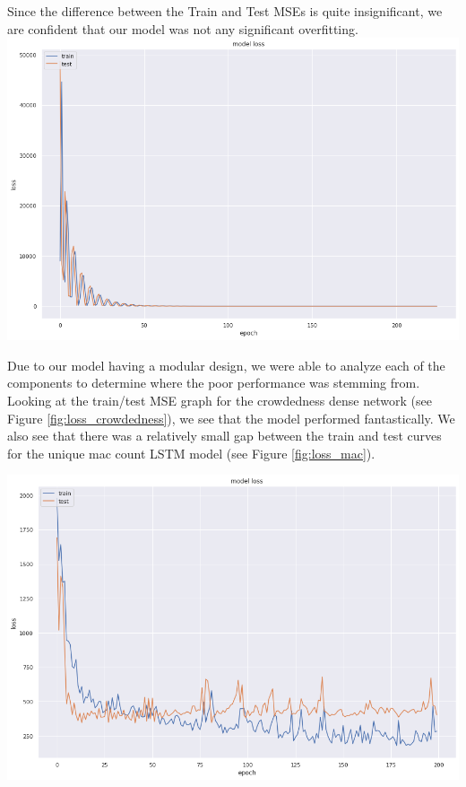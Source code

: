 \documentclass[journal, 12pt]{IEEEtran}
\begin{document}
\noindent Since the difference between the Train and Test MSEs is quite insignificant, we are confident that our model was not any significant overfitting. \\

\begingroup
    \center
    \medskip
    \includegraphics[width=\columnwidth]{report/final_report/images/crowdedness.png}
    \label{fig:loss_crowdedness}
    \medskip
\endgroup

\noindent Due to our model having a modular design, we were able to analyze each of the components to determine where the poor performance was stemming from. Looking at the train/test MSE graph for the crowdedness dense network (see Figure \ref{fig:loss_crowdedness}), we see that the model performed fantastically. We also see that there was a relatively small gap between the train and test curves for the unique mac count LSTM model (see Figure \ref{fig:loss_mac}).

\begingroup
    \center
    \medskip
    \includegraphics[width=\columnwidth]{report/final_report/images/macs.png}
    \label{fig:loss_mac}
    \medskip
\endgroup
\end{document}
